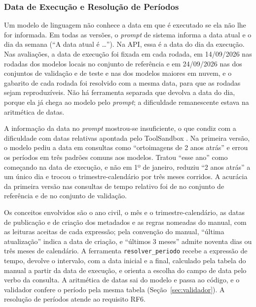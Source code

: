 \subsubsection{Data de Execução e Resolução de Períodos}
\label{sec:resolver-periodo}

Um modelo de linguagem não conhece a data em que é executado se ela não lhe for informada. Em todas as versões, o \textit{prompt} de sistema informa a data atual e o dia da semana (``A data atual é \ldots''). Na API, essa é a data do dia da execução. Nas avaliações, a data de execução foi fixada em cada rodada, em 14/09/2026 nas rodadas dos modelos locais no conjunto de referência e em 24/09/2026 nas dos conjuntos de validação e de teste e nas dos modelos maiores em nuvem, e o gabarito de cada rodada foi resolvido com a mesma data, para que as rodadas sejam reproduzíveis. Não há ferramenta separada que devolva a data do dia, porque ela já chega ao modelo pelo \textit{prompt}; a dificuldade remanescente estava na aritmética de datas.

A informação da data no \textit{prompt} mostrou-se insuficiente, o que condiz com a dificuldade com datas relativas apontada pelo ToolSandbox \cite{lu2025toolsandbox}. Na primeira versão, o modelo pediu a data em consultas como ``ortoimagens de 2 anos atrás'' e errou os períodos em três padrões comuns aos modelos. Tratou ``esse ano'' como começando na data de execução, e não em 1º de janeiro, reduziu ``2 anos atrás'' a um único dia e trocou o trimestre-calendário por três meses corridos. A acurácia da primeira versão nas consultas de tempo relativo foi de  no conjunto de referência e de  no conjunto de validação.

Os conceitos envolvidos são o ano civil, o mês e o trimestre-calendário, as datas de publicação e de criação dos metadados e as regras nomeadas do manual, com as leituras aceitas de cada expressão; pela convenção do manual, ``última atualização'' indica a data de criação, e ``últimos 3 meses'' admite noventa dias ou três meses de calendário. A ferramenta \texttt{resolver\_periodo} recebe a expressão de tempo, devolve o intervalo, com a data inicial e a final, calculado pela tabela do manual a partir da data de execução, e orienta a escolha do campo de data pelo verbo da consulta. A aritmética de datas sai do modelo e passa ao código, e o validador confere o período pela mesma tabela (Seção~\ref{sec:validador}). A resolução de períodos atende ao requisito RF6.

